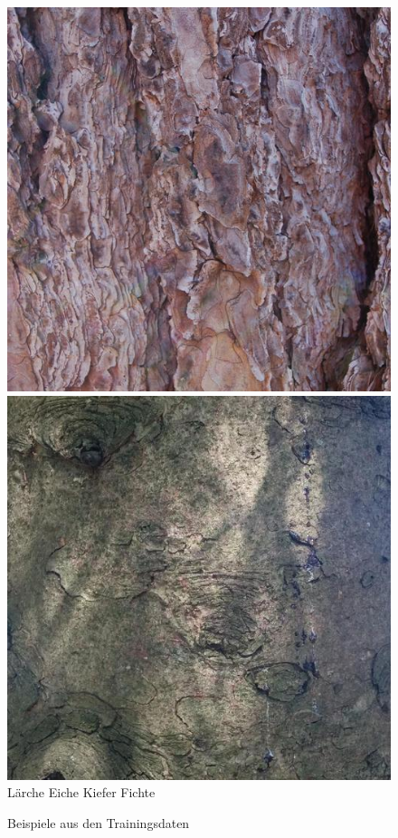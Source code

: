 \documentclass{article}
\begin{document}
\begin{figure}[htbp!]
  \includegraphics[width=0.24\linewidth]{examples/train/Pine}
  \includegraphics[width=0.24\linewidth]{examples/train/Spruce}
  Lärche \hspace{70pt} Eiche \hspace{70pt} Kiefer \hspace{70pt} Fichte\\
  \caption{Beispiele aus den Trainingsdaten}
  \label{train}
\end{figure}
\end{document}
